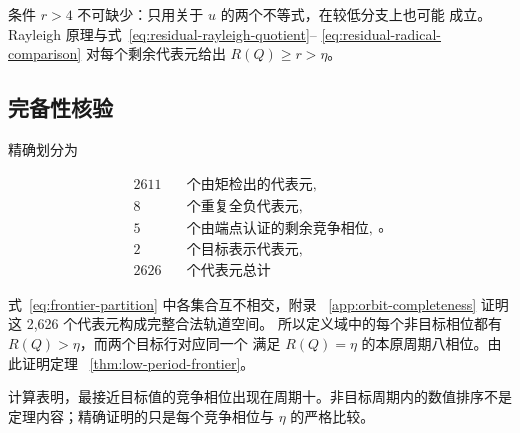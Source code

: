 条件 \(r>4\) 不可缺少：只用关于 \(u\) 的两个不等式，在较低分支上也可能
成立。Rayleigh 原理与式~\eqref{eq:residual-rayleigh-quotient}--
\eqref{eq:residual-radical-comparison} 对每个剩余代表元给出
\(R(Q)\geq r>\eta\)。

\subsection{完备性核验}

精确划分为

\begin{equation}
\label{eq:frontier-partition}
\begin{aligned}
2611&\quad\text{个由矩检出的代表元},\\
8&\quad\text{个重复全负代表元},\\
5&\quad\text{个由端点认证的剩余竞争相位},\\
2&\quad\text{个目标表示代表元},\\
2626&\quad\text{个代表元总计}
\end{aligned}
\text{。}
\end{equation}

式~\eqref{eq:frontier-partition} 中各集合互不相交，附录~
\ref{app:orbit-completeness} 证明这 2,626 个代表元构成完整合法轨道空间。
所以定义域中的每个非目标相位都有 \(R(Q)>\eta\)，而两个目标行对应同一个
满足 \(R(Q)=\eta\) 的本原周期八相位。由此证明定理~
\ref{thm:low-period-frontier}。

计算表明，最接近目标值的竞争相位出现在周期十。非目标周期内的数值排序不是
定理内容；精确证明的只是每个竞争相位与 \(\eta\) 的严格比较。
